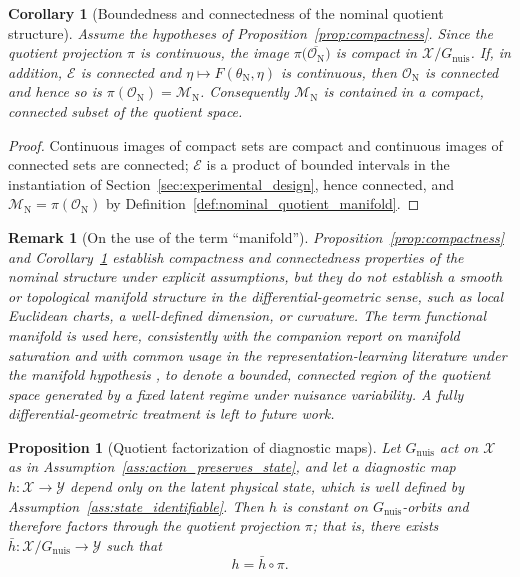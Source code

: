 \documentclass[a4paper]{cas-sc}
\newtheorem{proposition}{Proposition}
\newtheorem{corollary}{Corollary}
\newtheorem{remark}{Remark}
\newcommand{\X}{\ensuremath{\mathcal{X}}}
\newcommand{\EtaSpace}{\ensuremath{\mathcal{E}}}
\newcommand{\Mnominal}{\ensuremath{\mathcal{M}_{\mathrm{N}}}}
\newcommand{\Gnuis}{\ensuremath{G_{\mathrm{nuis}}}}
\newcommand{\quotient}{\ensuremath{\mathcal{X}/G_{\mathrm{nuis}}}}
\begin{document}
\begin{corollary}[Boundedness and connectedness of the nominal quotient structure]
\label{cor:bounded_manifold}
Assume the hypotheses of Proposition~\ref{prop:compactness}. Since the
quotient projection \(\pi\) is continuous, the image
\(\pi\bigl(\overline{\mathcal{O}_{\mathrm N}}\bigr)\) is compact in
\(\quotient\). If, in addition, \(\EtaSpace\) is connected and
\(\eta\mapsto F(\theta_{\mathrm N},\eta)\) is continuous, then
\(\mathcal{O}_{\mathrm N}\) is connected and hence so is
\(\pi(\mathcal{O}_{\mathrm N}) = \Mnominal\). Consequently \(\Mnominal\) is
contained in a compact, connected subset of the quotient space.
\end{corollary}

\begin{proof}
Continuous images of compact sets are compact and continuous images of
connected sets are connected; \(\EtaSpace\) is a product of bounded
intervals in the instantiation of
Section~\ref{sec:experimental_design}, hence connected, and
\(\Mnominal=\pi(\mathcal{O}_{\mathrm N})\) by
Definition~\ref{def:nominal_quotient_manifold}.
\end{proof}

\begin{remark}[On the use of the term ``manifold'']
\label{rem:manifold_terminology}
Proposition~\ref{prop:compactness} and
Corollary~\ref{cor:bounded_manifold} establish compactness and
connectedness properties of the nominal structure under explicit
assumptions, but they do \emph{not} establish a smooth or topological
manifold structure in the differential-geometric sense, such as local
Euclidean charts, a well-defined dimension, or curvature. The term
\emph{functional manifold} is used here, consistently with the companion
report on manifold saturation \citep{disanti2026inverse} and with common
usage in the representation-learning literature under the manifold
hypothesis \citep{bronstein2021}, to denote a bounded, connected region of
the quotient space generated by a fixed latent regime under nuisance
variability. A fully differential-geometric treatment is left to future
work.
\end{remark}

\begin{proposition}[Quotient factorization of diagnostic maps]
\label{prop:quotient_diagnosis}
Let \(\Gnuis\) act on \(\X\) as in
Assumption~\ref{ass:action_preserves_state}, and let a diagnostic map
\(h:\X\to\mathcal{Y}\) depend only on the latent physical state, which is
well defined by Assumption~\ref{ass:state_identifiable}. Then \(h\) is
constant on \(\Gnuis\)-orbits and therefore factors through the quotient
projection \(\pi\); that is, there exists
\(\bar h:\quotient\to\mathcal{Y}\) such that
\begin{equation}
h = \bar h \circ \pi .
\label{eq:factorization}
\end{equation}
\end{proposition}
\end{document}
